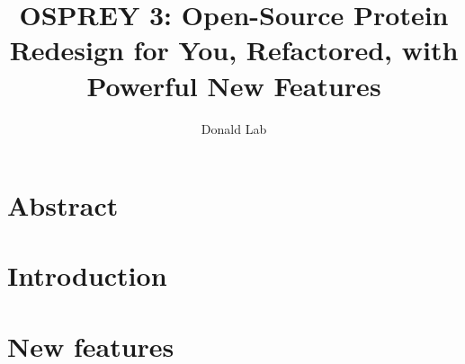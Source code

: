 \documentclass[11pt, oneside]{article}   	%
\title{OSPREY 3: Open-Source Protein Redesign for You, Refactored, with Powerful New Features}
\author{Donald Lab}
\begin{document}
\maketitle

\section{Abstract}
\section{Introduction}
\section{New features}
\end{document}
